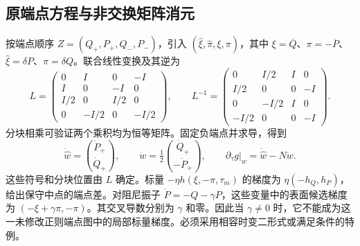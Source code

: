 \subsection{原端点方程与非交换矩阵消元}
按端点顺序 $Z=(Q_+,P_+,Q_-,P_-)$，引入 $(\widehat\xi,\widehat\pi,\xi,\pi)$，其中 $\xi=\overline Q$、$\pi=-\overline P$、$\widehat\xi=\delta P$、$\widehat\pi=\delta Q$。联合线性变换及其逆为
\begin{equation}
 L=\begin{pmatrix}
 0&I&0&-I\\I&0&-I&0\\I/2&0&I/2&0\\0&-I/2&0&-I/2
 \end{pmatrix},\qquad
 L^{-1}=\begin{pmatrix}
 0&I/2&I&0\\I/2&0&0&-I\\0&-I/2&I&0\\-I/2&0&0&-I
 \end{pmatrix}.
 \label{eq:sup-original-matrix}
\end{equation}
分块相乘可验证两个乘积均为恒等矩阵。固定负端点并求导，得到
\begin{equation}
 \dot{\widehat w}=\binom{\dot P_+}{\dot Q_+},\qquad
 \dot w=\tfrac12\binom{\dot Q_+}{-\dot P_+},\qquad
 \partial_\tau g|_w=\dot{\widehat w}-N\dot w.
 \label{eq:sup-original-chain}
\end{equation}
这些符号和分块位置由 $L$ 确定。标量 $-\eta h(\xi,-\pi,\tau_m)$ 的梯度为 $\eta(-h_Q,h_P)$，给出保守中点的端点差。对阻尼振子 $\dot P=-Q-\gamma P$，这些变量中的表面候选梯度为 $(-\xi+\gamma\pi,-\pi)$。其交叉导数分别为 $\gamma$ 和零。因此当 $\gamma\ne0$ 时，它不能成为这一未修改正则端点图中的局部标量梯度。必须采用相容时变二形式或满足条件的特例。

